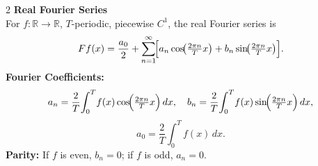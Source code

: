 \documentclass[8pt]{article}
\begin{document}
\begin{multicols}{2}
	\noindent \textbf{Real Fourier Series}\\
	For $f:\mathbb{R}\to\mathbb{R}$, $T$-periodic, piecewise $C^1$, the real Fourier series is \vspace{-3px}
	\[ \vspace{-8px}
		Ff(x)= \frac{a_{0}}{2}
		+ \sum_{n=1}^{\infty}\!\Bigl[a_{n}\cos\!\bigl(\tfrac{2\pi n}{T}x\bigr)
			+ b_{n}\sin\!\bigl(\tfrac{2\pi n}{T}x\bigr)\Bigr].
	\]
	\noindent \textbf{Fourier Coefficients:} \vspace{-3px}
	\[
		a_{n} = \frac{2}{T}\!\int_{0}^{T}\!f(x)
		\cos\!\Bigl(\tfrac{2\pi n}{T}x\Bigr)\,dx,\quad
		b_{n} = \frac{2}{T}\!\int_{0}^{T}\!f(x)
		\sin\!\Bigl(\tfrac{2\pi n}{T}x\Bigr)\,dx,
	\] \vspace{-8px}
	\[
		a_{0} = \frac{2}{T}\int_{0}^{T} f(x)\,dx.
	\]
	\noindent \textbf{Parity:} If $f$ is even, $b_{n}=0$; if $f$ is odd, $a_{n}=0$.\\

	\small


\end{multicols}
\end{document}

